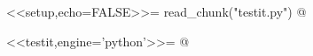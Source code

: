 \documentclass[12pt]{article}
\begin{document}
<<setup,echo=FALSE>>=
read_chunk("testit.py")
@

<<testit,engine='python'>>=
@
\end{document}
